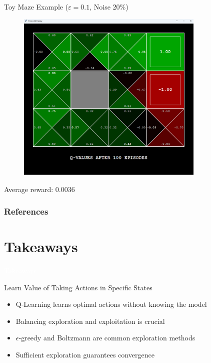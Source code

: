 \documentclass[11pt,table]{beamer}
\begin{document}
\begin{frame}{Toy Maze Example ($\varepsilon=0.1$, Noise 20\%)}
\begin{figure}
	\centering
		\includegraphics[width=0.80\textwidth]{figures/gridworld_qvalues_epsilon10.png}
	\label{fig:gridworld_values}
\end{figure}
Average reward: 0.0036
\end{frame}


\begin{frame}[t,allowframebreaks
]\nocite{*}
\frametitle{References}
\footnotesize

\end{frame}
\section{Takeaways}
{
\begin{frame}
\centering
\Huge
\textcolor{white}{Takeaways}
\thispagestyle{empty}
\end{frame}
}

\begin{frame}{Learn Value of Taking Actions in Specific States}
\begin{itemize}
    \item Q-Learning learns optimal actions without knowing the model
    \item Balancing exploration and exploitation is crucial
    \item $\epsilon$-greedy and Boltzmann are common exploration methods
    \item Sufficient exploration guarantees convergence
\end{itemize}
\end{frame}
\end{document}
